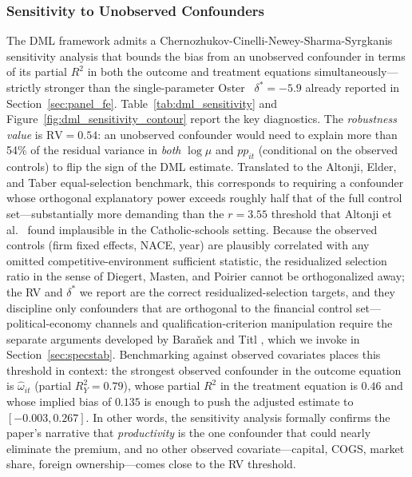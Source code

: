 \documentclass[11pt]{article}
\begin{document}


\subsubsection{Sensitivity to Unobserved Confounders}\label{sec:dml_sensitivity}

The DML framework admits a Chernozhukov-Cinelli-Newey-Sharma-Syrgkanis \cite{ChernozhukovSensitivity2019} sensitivity analysis that bounds the bias from an unobserved confounder in terms of its partial $R^2$ in both the outcome and treatment equations simultaneously---strictly stronger than the single-parameter Oster~\cite{Oster2019} $\delta^* = -5.9$ already reported in Section~\ref{sec:panel_fe}. Table~\ref{tab:dml_sensitivity} and Figure~\ref{fig:dml_sensitivity_contour} report the key diagnostics. The \emph{robustness value} is $\text{RV} = 0.54$: an unobserved confounder would need to explain more than 54\% of the residual variance in \emph{both} $\log \mu$ and $pp_{it}$ (conditional on the observed controls) to flip the sign of the DML estimate. Translated to the Altonji, Elder, and Taber \cite{AltonjiElderTaber2005} equal-selection benchmark, this corresponds to requiring a confounder whose orthogonal explanatory power exceeds roughly half that of the full control set---substantially more demanding than the $r = 3.55$ threshold that Altonji et al.~\cite{AltonjiElderTaber2005} found implausible in the Catholic-schools setting. Because the observed controls (firm fixed effects, NACE, year) are plausibly correlated with any omitted competitive-environment sufficient statistic, the residualized selection ratio in the sense of Diegert, Masten, and Poirier \cite{DiegertMastenPoirier2022} cannot be orthogonalized away; the RV and $\delta^*$ we report are the correct residualized-selection targets, and they discipline only confounders that are orthogonal to the financial control set---political-economy channels and qualification-criterion manipulation require the separate arguments developed by Bara\v{n}ek and Titl \cite{BaranekTitl2024}, which we invoke in Section~\ref{sec:specstab}. Benchmarking against observed covariates places this threshold in context: the strongest observed confounder in the outcome equation is $\hat\omega_{it}$ (partial $R^2_Y = 0.79$), whose partial $R^2$ in the treatment equation is $0.46$ and whose implied bias of $0.135$ is enough to push the adjusted estimate to $[-0.003, 0.267]$. In other words, the sensitivity analysis formally confirms the paper's narrative that \emph{productivity} is the one confounder that could nearly eliminate the premium, and no other observed covariate---capital, COGS, market share, foreign ownership---comes close to the RV threshold.
\end{document}
